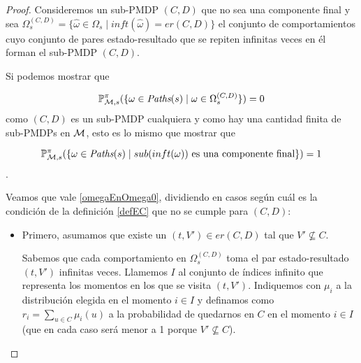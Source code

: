 \begin{proof}
	Consideremos un sub-PMDP $(C,D)$ que no sea una componente final y sea $\Omega_s^{(C,D)} = \{\hat{\omega} \in \Omega_s \mid inft(\hat{\omega}) = er(C, D)\}$ el conjunto de comportamientos cuyo conjunto de pares estado-resultado que se repiten infinitas veces en él forman el sub-PMDP $(C,D)$.

	Si podemos mostrar que

	\begin{equation}\label{omegaEnOmega0}
		\mathbb{P}^\pi_{\mathcal{M}, s}(\{ \omega \in \textit{Paths}(s) \mid \omega \in \Omega_s^{(C,D)}\}) = 0
	\end{equation} como $(C,D)$ es un sub-PMDP cualquiera y como hay una cantidad finita de sub-PMDPs en $\mathcal{M}$, esto es lo mismo que mostrar que

	$$\mathbb{P}^\pi_{\mathcal{M}, s}(\{ \omega \in \textit{Paths}(s) \mid sub(inft(\omega)) \text{ es una componente final}\}) = 1$$.

	Veamos que vale \ref{omegaEnOmega0}, dividiendo en casos según cuál es la
	condición de la definición \ref{defEC} que no se cumple para $(C,D)$:

	\begin{itemize}
		\item Primero, asumamos que existe un $(t, V') \in er(C,D)$ tal que $V' \nsubseteq
			      C$.



		      Sabemos que cada comportamiento en $\Omega_s^{(C,D)}$ toma el par
		      estado-resultado $(t, V')$ infinitas veces. Llamemos $I$ al conjunto de índices
		      infinito que representa los momentos en los que se visita $(t, V')$. Indiquemos
		      con $\mu_i$ a la distribución elegida en el momento $i \in I$ y definamos como
		      $r_i = \sum_{u \in C} \mu_i(u)$ a la probabilidad de quedarnos en $C$ en el
		      momento $i \in I$ (que en cada caso será menor a 1 porque $V' \nsubseteq C$). %


\end{itemize}
\end{proof}
